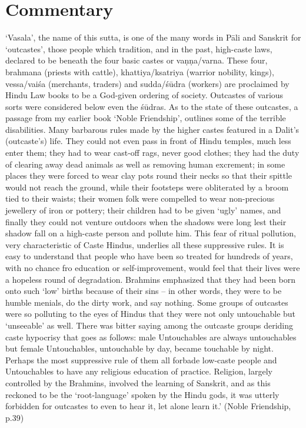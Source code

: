 \section{Commentary}
`Vasala', the name of this sutta, is one of the many words in P\=ali and Sanskrit for `outcastes', those people which tradition, and in the past, high-caste laws, declared to be beneath the four basic castes or vaṇṇa/varna. These four, brahmana (priests with cattle), khattiya/ksatriya (warrior nobility, kings), vessa/vaiśa (merchants, traders) and sudda/śūdra (workers) are proclaimed by Hindu Law books to be a God-given ordering of society. Outcastes of various sorts were considered below even the śūdras. 
As to the state of these outcastes, a passage from my earlier book `Noble Friendship', outlines some of the terrible disabilities.
Many barbarous rules made by the higher castes featured in a Dalit's (outcaste's) life. They could not even pass in front of Hindu temples, much less enter them; they had to wear cast-off rags, never good clothes; they had the duty of clearing away dead animals as well as removing human excrement; in some places they were forced to wear clay pots round their necks  so that their spittle would not reach the ground, while their footsteps were obliterated by a broom tied to their waists; their women folk were compelled to wear non-precious jewellery of iron or pottery; their children had to be given `ugly' names, and finally they could not venture outdoors when the shadows were long lest their shadow fall on a high-caste person and pollute him. This fear of ritual pollution, very characteristic of Caste Hindus, underlies all these suppressive rules. It is easy to understand that people who have been so treated for hundreds of years, with no chance fro education or self-improvement, would feel that their lives were a hopeless round of degradation. Brahmins emphasized that they had been born onto such `low' births because of their sins – in other words, they were to be humble menials, do the dirty work, and say nothing. Some groups of outcastes were so polluting to the eyes of Hindus that they were not only untouchable but `unseeable' as well. There was bitter saying among the outcaste groups deriding caste hypocrisy that goes as follows: male Untouchables are always untouchables but female Untouchables, untouchable by day, became touchable by night. Perhaps the most suppressive rule of them all forbade low-caste people and Untouchables to have any religious education of practice. Religion, largely controlled by the Brahmins, involved the learning of Sanskrit, and as this reckoned to be the `root-language' spoken by the Hindu gods, it was utterly forbidden for outcastes to even to hear it, let alone learn it.' (Noble Friendship, p.39)
